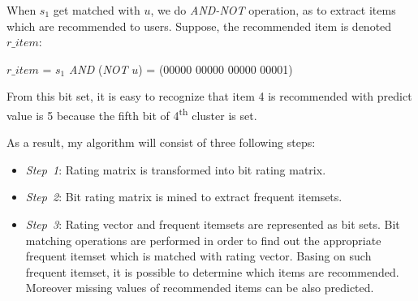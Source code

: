 \documentclass[10pt]{article}
\begin{document}
When $s_1$ get matched with $u$, we do \textit{AND-NOT} operation, as to extract items which are recommended to users. Suppose, the recommended item is denoted $r\_item$:
\begin{center}
$r\_item$ = $s_1$ \textit{AND} (\textit{NOT} $u$) = (00000 00000 00000 00001)
\end{center}
From this bit set, it is easy to recognize that item 4 is recommended with predict value is 5 because the fifth bit of 4\textsuperscript{th} cluster is set.

As a result, my algorithm will consist of three following steps:
\begin{itemize}
\item \textit{Step~1}: Rating matrix is transformed into bit rating matrix.
\item \textit{Step~2}: Bit rating matrix is mined to extract frequent itemsets.
\item \textit{Step~3}: Rating vector and frequent itemsets are represented as bit sets. Bit matching operations are performed in order to find out the appropriate frequent itemset which is matched with rating vector. Basing on such frequent itemset, it is possible to determine which items are recommended. Moreover missing values of recommended items can be also predicted.
\end{itemize}
\end{document}
